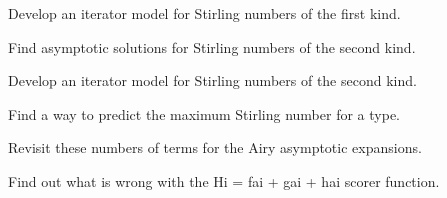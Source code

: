 \begin{DoxyRefList}
Develop an iterator model for Stirling numbers of the first kind.  
\item[\label{todo__todo000016}%
\Hypertarget{todo__todo000016}%
Member \hyperlink{namespacestd_1_1____detail_a4589d459a7a9d1d9e19b33601238a4af}{std\+:\+:\+\_\+\+\_\+detail\+:\+:\+\_\+\+\_\+stirling\+\_\+2} (unsigned int \+\_\+\+\_\+n, unsigned int \+\_\+\+\_\+m)]Find asymptotic solutions for Stirling numbers of the second kind. 

Develop an iterator model for Stirling numbers of the second kind.  
\item[\label{todo__todo000015}%
\Hypertarget{todo__todo000015}%
Member \hyperlink{namespacestd_1_1____detail_a8408f17699eb43a14447c7e4795b277f}{std\+:\+:\+\_\+\+\_\+detail\+:\+:\+\_\+\+\_\+stirling\+\_\+2\+\_\+series} (unsigned int \+\_\+\+\_\+n, unsigned int \+\_\+\+\_\+m)]Find a way to predict the maximum Stirling number for a type.  
\item[\label{todo__todo000007}%
\Hypertarget{todo__todo000007}%
Member \hyperlink{classstd_1_1____detail_1_1__Airy__asymp_a64bce3ed154b3268944ae20f324d64cd}{std\+:\+:\+\_\+\+\_\+detail\+:\+:\+\_\+\+Airy\+\_\+asymp$<$ \+\_\+\+Tp $>$\+:\+:\+\_\+\+S\+\_\+absarg\+\_\+lt\+\_\+pio3} (\+\_\+\+Cmplx \+\_\+\+\_\+z) const]Revisit these numbers of terms for the Airy asymptotic expansions.  
\item[\label{todo__todo000006}%
\Hypertarget{todo__todo000006}%
Member \hyperlink{classstd_1_1____detail_1_1__Airy__series_a71f68d64f0e202c4f98146f90c6b3298}{std\+:\+:\+\_\+\+\_\+detail\+:\+:\+\_\+\+Airy\+\_\+series$<$ \+\_\+\+Tp $>$\+:\+:\+\_\+\+S\+\_\+\+Scorer} (\+\_\+\+Cmplx \+\_\+\+\_\+t)]Find out what is wrong with the Hi = fai + gai + hai scorer function.
\end{DoxyRefList}